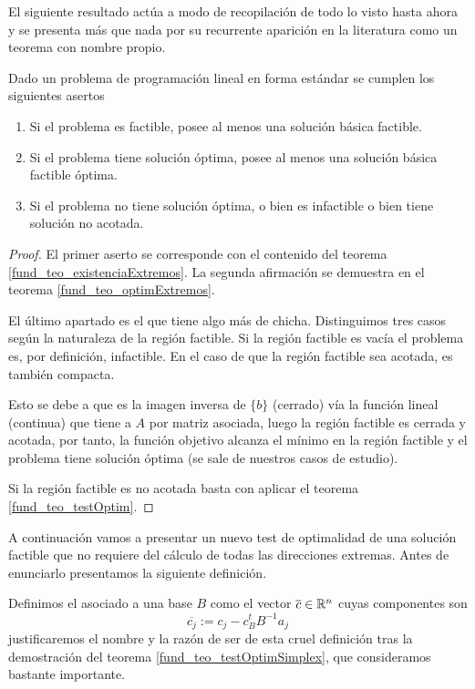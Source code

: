 El siguiente resultado actúa a modo de recopilación de todo lo visto hasta ahora y se presenta más que nada por su recurrente aparición en la literatura como un teorema con nombre propio.
\begin{theo}
	\label{fund_teo_fund}
	Dado un problema de programación lineal en forma estándar se cumplen los siguientes asertos
	\begin{enumerate}
		\item Si el problema es factible, posee al menos una solución básica factible.
		\item Si el problema tiene solución óptima, posee al menos una solución básica factible óptima.
		\item Si el problema no tiene solución óptima, o bien es infactible o bien tiene solución no acotada.
	\end{enumerate}
\end{theo}
\begin{proof}
	El primer aserto se corresponde con el contenido del teorema \ref{fund_teo_existenciaExtremos}. La segunda afirmación se demuestra en el teorema \ref{fund_teo_optimExtremos}.
	
	El último apartado es el que tiene algo más de chicha. Distinguimos tres casos según la naturaleza de la región factible. Si la región factible es vacía el problema es, por definición, infactible. En el caso de que la región factible sea acotada, es también compacta. 
	
	Esto se debe a que es la imagen inversa de $\{b\}$ (cerrado) vía la función lineal (continua) que tiene a $A$ por matriz asociada, luego la región factible es cerrada y acotada, por tanto, la función objetivo alcanza el mínimo en la región factible y el problema tiene solución óptima (se sale de nuestros casos de estudio).
	
	Si la región factible es no acotada basta con aplicar el teorema \ref{fund_teo_testOptim}.
\end{proof}
A continuación vamos a presentar un nuevo test de optimalidad de una solución factible que no requiere del cálculo de todas las direcciones extremas. Antes de enunciarlo presentamos la siguiente definición.
\begin{defi}
	Definimos el  asociado a una base $B$ como el vector $\overline{c}\in\mathbb{R}^n$ cuyas componentes son
	\begin{equation*}
		\overline{c_j}:=c_j-c_B^tB^{-1}a_j
	\end{equation*}
	justificaremos el nombre y la razón de ser de esta cruel definición tras la demostración del teorema \ref{fund_teo_testOptimSimplex}, que consideramos bastante importante.
\end{defi}
